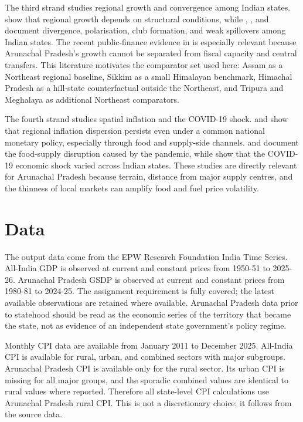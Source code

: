 \documentclass[11pt,a4paper]{article}
\begin{document}
The third strand studies regional growth and convergence among Indian states. \citet{sachs_bajpai_ramiah_2002} show that regional growth depends on structural conditions, while \citet{bhattacharya_sakthivel_2004}, \citet{bandyopadhyay_2006}, and \citet{sodsriwiboon_kalra_2010} document divergence, polarisation, club formation, and weak spillovers among Indian states. The recent public-finance evidence in \citet{govil_chauhan_2024} is especially relevant because Arunachal Pradesh's growth cannot be separated from fiscal capacity and central transfers. This literature motivates the comparator set used here: Assam as a Northeast regional baseline, Sikkim as a small Himalayan benchmark, Himachal Pradesh as a hill-state counterfactual outside the Northeast, and Tripura and Meghalaya as additional Northeast comparators.

The fourth strand studies spatial inflation and the COVID-19 shock. \citet{kundu_kishore_bhoi_2018} and \citet{jha_dhal_2019} show that regional inflation dispersion persists even under a common national monetary policy, especially through food and supply-side channels. \citet{mahajan_tomar_2020} and \citet{narayanan_saha_2021} document the food-supply disruption caused by the pandemic, while \citet{beyer_francobedoya_galdo_2020} show that the COVID-19 economic shock varied across Indian states. These studies are directly relevant for Arunachal Pradesh because terrain, distance from major supply centres, and the thinness of local markets can amplify food and fuel price volatility.

\section{Data}

The output data come from the EPW Research Foundation India Time Series. All-India GDP is observed at current and constant prices from 1950-51 to 2025-26. Arunachal Pradesh GSDP is observed at current and constant prices from 1980-81 to 2024-25. The assignment requirement is fully covered; the latest available observations are retained where available. Arunachal Pradesh data prior to statehood should be read as the economic series of the territory that became the state, not as evidence of an independent state government's policy regime.

Monthly CPI data are available from January 2011 to December 2025. All-India CPI is available for rural, urban, and combined sectors with major subgroups. Arunachal Pradesh CPI is available only for the rural sector. Its urban CPI is missing for all major groups, and the sporadic combined values are identical to rural values where reported. Therefore all state-level CPI calculations use Arunachal Pradesh rural CPI. This is not a discretionary choice; it follows from the source data.
\end{document}

